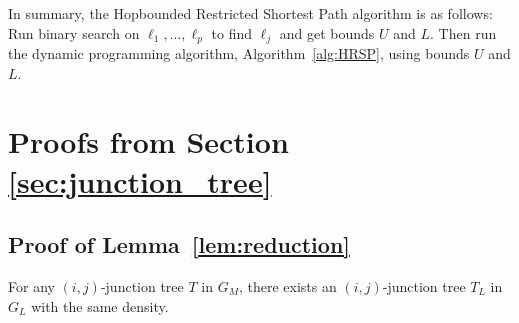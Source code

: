 In summary, the Hopbounded Restricted Shortest Path algorithm is as follows: Run binary search on $\ell_1, \dots, \ell_p$ to find $\ell_j$ and get bounds $U$ and $L$. Then run the dynamic programming algorithm, Algorithm~\ref{alg:HRSP}, using bounds $U$ and $L$.

\section{Proofs from Section \ref{sec:junction_tree}}

\subsection{Proof of Lemma~\ref{lem:reduction}} \label{app:reduction}
\begin{lemma}
\label{cl:input_to_layered}
    For any $(i,j)$-junction tree $T$ in $G_M$, there exists an $(i,j)$-junction tree $T_L$ in $G_L$ with the same density. 
\end{lemma}
